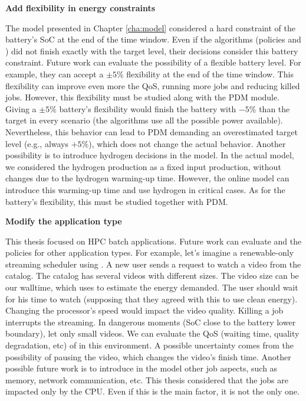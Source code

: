 \textbf{Add flexibility in energy constraints}

The model presented in Chapter \ref{cha:model} considered a hard constraint of the battery's SoC at the end of the time window. Even if the algorithms (policies and \emph{\systemName}) did not finish exactly with the target level, their decisions consider this battery constraint. Future work can evaluate the possibility of a flexible battery level. For example, they can accept a $\pm 5\%$ flexibility at the end of the time window. This flexibility can improve even more the QoS, running more jobs and reducing killed jobs. However, this flexibility must be studied along with the PDM module. Giving a $\pm 5\%$ battery's flexibility would finish the battery with $-5\%$ than the target in every scenario (the algorithms use all the possible power available). Nevertheless, this behavior can lead to PDM demanding an overestimated target level (e.g., always $+5\%$), which does not change the actual behavior. Another possibility is to introduce hydrogen decisions in the model. In the actual model, we considered the hydrogen production as a fixed input production, without changes due to the hydrogen warming-up time. However, the online model can introduce this warming-up time and use hydrogen in critical cases. As for the battery's flexibility, this must be studied together with PDM.

\textbf{Modify the application type}

This thesis focused on HPC batch applications. Future work can evaluate \emph{\systemName} and the policies for other application types. For example, let's imagine a renewable-only streaming scheduler using \emph{\systemName}. A new user sends a request to watch a video from the catalog. The catalog has several videos with different sizes. The video size can be our walltime, which \emph{\systemName} uses to estimate the energy demanded. The user should wait for his time to watch (supposing that they agreed with this to use clean energy). Changing the processor's speed would impact the video quality. Killing a job interrupts the streaming. In dangerous moments (SoC close to the battery lower boundary), \emph{\systemName} let only small videos. We can evaluate the QoS (waiting time, quality degradation, etc) of \emph{\systemName} in this environment. A possible uncertainty comes from the possibility of pausing the video, which changes the video's finish time. Another possible future work is to introduce in the model other job aspects, such as memory, network communication, etc. This thesis considered that the jobs are impacted only by the CPU. Even if this is the main factor, it is not the only one.

